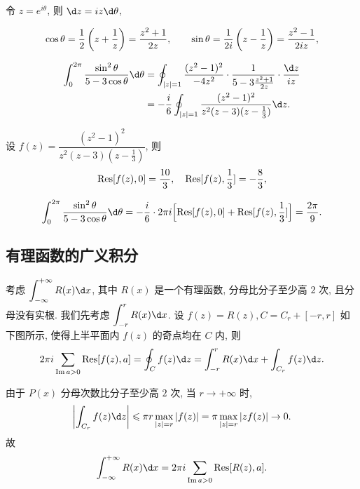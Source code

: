 \begin{solution}
	令 $z=e^{i\theta}$, 则 $\d z=iz\d\theta$,
	{
		\[\cos\theta=\frac{1}{2}\left(z+\frac1z\right)=\frac{z^2+1}{2z},\qquad
		\sin\theta=\frac1{2i}\left(z-\frac1z\right)=\frac{z^2-1}{2iz},\]

		\begin{align*}
			\int_0^{2\pi}\frac{\sin^2\theta}{5-3\cos\theta}\d\theta
			&=\oint_{|z|=1}\frac{(z^2-1)^2}{-4z^2}\cdot\frac1{5-3\frac{z^2+1}{2z}}\cdot\frac{\d z}{iz}\\
			&=-\frac i6\oint_{|z|=1}\frac{(z^2-1)^2}{z^2(z-3)(z-\frac13)}\d z.
		\end{align*}
	}
	设 $f(z)=\dfrac{(z^2-1)^2}{z^2(z-3)(z-\frac13)}$,
	{则
		\[{\mathrm{Res}}[f(z),0]=\frac{10}3,\quad{\mathrm{Res}}[f(z),\frac13]=-\frac83,\]
	}

	{
		\[
			\int_0^{2\pi}\frac{\sin^2\theta}{5-3\cos\theta}\d\theta
			=-\frac i6\cdot 2\pi i\Bigl[\Res[f(z),0]+\Res[f(z),\frac13]\Bigr]
			=\frac{2\pi}9.
		\]
	}
\end{solution}

\subsection{有理函数的广义积分}

考虑 $\displaystyle\int_{-\infty}^{+\infty}R(x)\d x$, 其中 $R(x)$ 是一个有理函数, 分母比分子至少高 $2$ 次, 且分母没有实根.
我们先考虑 $\displaystyle\int_{-r}^rR(x)\d x$.
设 $f(z)=R(z),C=C_r+[-r,r]$ 如下图所示, 使得上半平面内 $f(z)$ 的奇点均在 $C$ 内,
则
\[2\pi i\sum_{\Im a>0}\Res[f(z),a]=\oint_Cf(z)\d z=\int_{-r}^rR(x)\d x+\int_{C_r}f(z)\d z.\]

\begin{center}
\end{center}

由于 $P(x)$ 分母次数比分子至少高 $2$ 次,
当 $r\to+\infty$ 时,
\[\abs{\int_{C_r}f(z)\d z}\le \pi r\max_{|z|=r}|f(z)|
=\pi \max_{|z|=r}|zf(z)|\to 0.\]
故
	\[\int_{-\infty}^{+\infty}R(x)\d x=2\pi i\sum_{\Im a>0}\Res[R(z),a].\]

